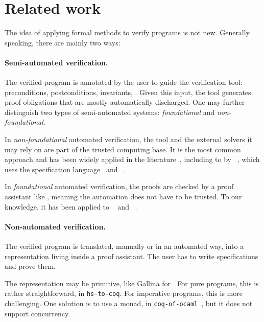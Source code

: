 \section{Related work}
\label{sec:related}

The idea of applying formal methods to verify \OCaml programs is not new.
Generally speaking, there are mainly two ways:

\paragraph{Semi-automated verification.}

The verified program is annotated by the user to guide the verification tool: preconditions, postconditions, invariants, \etc.
Given this input, the tool generates proof obligations that are mostly automatically discharged.
One may further distinguish two types of semi-automated systems: \emph{foundational} and \emph{non-foundational}.

In \emph{non-foundational} automated verification, the tool and the external solvers it may rely on are part of the trusted computing base.
It is the most common approach and has been widely applied in the literature~\cite{DBLP:journals/jfp/SwamyCFSBY13, DBLP:series/natosec/0001SS17, DBLP:conf/nfm/JacobsSPVPP11, DBLP:conf/icfem/DenisJM22, DBLP:conf/nfm/AstrauskasBFGMM22, DBLP:conf/esop/FilliatreP13}, including to \OCaml by \Cameleer~\cite{DBLP:conf/cav/PereiraR20}, which uses the \Gospel specification language~\cite{DBLP:conf/fm/ChargueraudFLP19} and \WhyThree~\cite{DBLP:conf/esop/FilliatreP13}.

In \emph{foundational} automated verification, the proofs are checked by a proof assistant like \Coq, meaning the automation does not have to be trusted.
To our knowledge, it has been applied to \C~\cite{DBLP:conf/pldi/SammlerLKMD021} and \Rust~\cite{DBLP:journals/pacmpl/GaherSJKD24}.

\paragraph{Non-automated verification.}

The verified program is translated, manually or in an automated way, into a representation living inside a proof assistant.
The user has to write specifications and prove them.

The representation may be primitive, like Gallina for \Coq.
For pure programs, this is rather straightforward, \eg in \texttt{hs-to-coq}\cite{DBLP:conf/cpp/Spector-Zabusky18}.
For imperative programs, this is more challenging.
One solution is to use a monad, \eg in \texttt{coq-of-ocaml}~\cite{coq-of-ocaml}, but it does not support concurrency.

